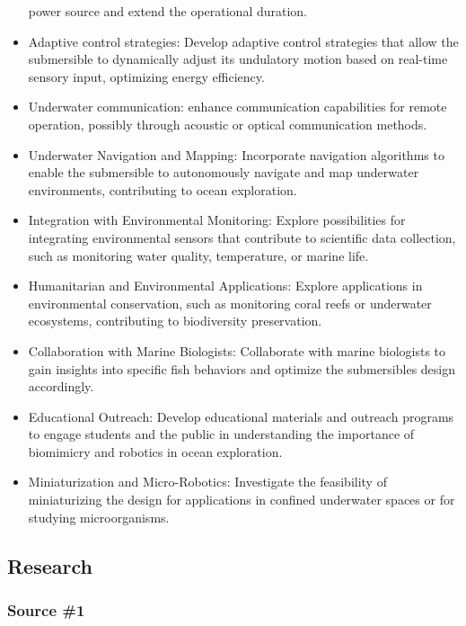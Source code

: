 \begin{itemize}
  power source and extend the operational duration.
\item
  Adaptive control strategies: Develop adaptive control strategies that
  allow the submersible to dynamically adjust its undulatory motion
  based on real-time sensory input, optimizing energy efficiency.
\item
  Underwater communication: enhance communication capabilities for
  remote operation, possibly through acoustic or optical communication
  methods.
\item
  Underwater Navigation and Mapping: Incorporate navigation algorithms
  to enable the submersible to autonomously navigate and map underwater
  environments, contributing to ocean exploration.
\item
  Integration with Environmental Monitoring: Explore possibilities for
  integrating environmental sensors that contribute to scientific data
  collection, such as monitoring water quality, temperature, or marine
  life.
\item
  Humanitarian and Environmental Applications: Explore applications in
  environmental conservation, such as monitoring coral reefs or
  underwater ecosystems, contributing to biodiversity preservation.
\item
  Collaboration with Marine Biologists: Collaborate with marine
  biologists to gain insights into specific fish behaviors and optimize
  the submersible\textquotesingle s design accordingly.
\item
  Educational Outreach: Develop educational materials and outreach
  programs to engage students and the public in understanding the
  importance of biomimicry and robotics in ocean exploration.
\item
  Miniaturization and Micro-Robotics: Investigate the feasibility of
  miniaturizing the design for applications in confined underwater
  spaces or for studying microorganisms.
\end{itemize}

\subsection{Research}\label{research}

\subsubsection{\texorpdfstring{\textbf{Source
\#1}}{Source \#1}}\label{source-1}

